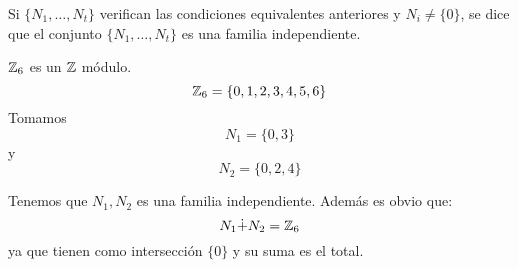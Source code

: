 \begin{df}
  Si \(\{N_1,\ldots, N_t\}\) verifican las condiciones equivalentes
  anteriores y \(N_i\neq \{0\}\), se dice que el conjunto
  \(\{N_1,\ldots, N_t\}\) es una familia independiente.
\end{df}

\begin{ejemplo}
  \(\mathbb{Z}_6\) es un \(\mathbb{Z}\) módulo.
  \[
    \mathbb{Z}_6=\{0,1,2,3,4,5,6\}
  \]
  Tomamos
  \[
    N_1=\{0,3\}
  \]
  y
  \[
    N_2=\{0,2,4\}
  \]

  Tenemos que \(N_1, N_2\) es una familia independiente. Además es obvio que:
  \[
    N_1\dot{+}N_2=\mathbb{Z}_6
  \]
  ya que tienen como intersección \(\{0\}\) y su suma es el total.
\end{ejemplo}
